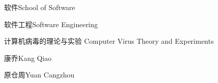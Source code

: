 
\school
{软件}{School of Software}

\major
{软件工程}{Software Engineering}

\thesistitle
{计算机病毒的理论与实验}
{}
{Computer Virus Theory and Experiments}
{}

\thesisauthor
{康乔}{Kang Qiao}

\teacher
{ 原仓周}{Yuan Cangzhou}






